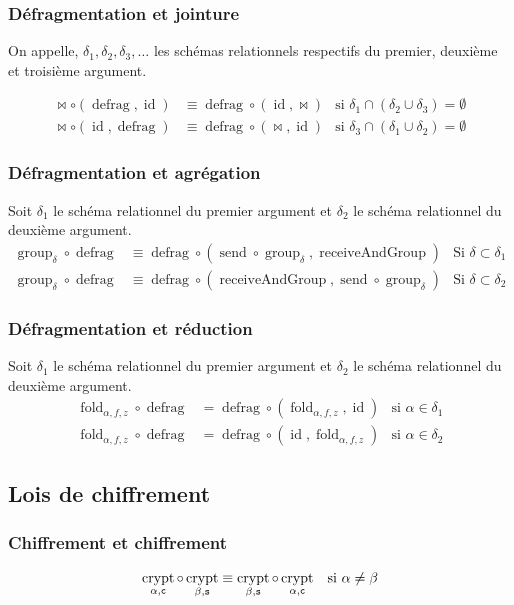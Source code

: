 \documentclass[french]{article}
\DeclareMathOperator{\defrag}{defrag}
\DeclareMathOperator{\crypt}{crypt}
\DeclareMathOperator{\group}{group}
\DeclareMathOperator{\id}{id}
\DeclareMathOperator{\send}{send}
\DeclareMathOperator{\rec}{receiveAndGroup}
\newcommand\typeT[1]{\text{\ttfamily #1}}
\newcommand{\cryptArgs}[2]{\crypt_{#1 , \typeT{#2}}}
\newcommand{\cryptCAlpha}{\cryptArgs{\alpha}{c}}
\newcommand{\groupDelta}{\group_{\delta}}
\newcommand{\fold}[3]{\operatorname{fold}_{#1, #2, #3}}
\newcommand{\foldAlphafz}{\fold{\alpha}{f}{z}}
\newcommand{\args}{Soit $\delta_1$ le schéma relationnel du premier
	argument et $\delta_2$ le schéma relationnel du deuxième
	argument.}
\begin{document}
\subsubsection*{Défragmentation et jointure}
On appelle,
$\delta_1, \delta_2, \delta_3, \dots$ 
les schémas relationnels respectifs
du premier, deuxième et troisième argument.

\begin{align}
\Join \circ (\defrag, \id)
& \equiv
\defrag \circ (\id, \Join)
& \text{si $\delta_1 \cap (\delta_2 \cup \delta_3) = \emptyset$} \\
\Join \circ (\id, \defrag)
& \equiv
\defrag \circ (\Join, \id)
& \text{si $\delta_3 \cap (\delta_1 \cup \delta_2) = \emptyset$} 
\end{align}

\subsubsection*{Défragmentation et agrégation}
\args
\begin{align}
\groupDelta \circ \defrag 
& \equiv \defrag \circ (\send\circ\groupDelta, \rec)
& \text{Si $\delta \subset \delta_1$} \\
\groupDelta \circ \defrag 
& \equiv \defrag \circ (\rec, \send\circ\groupDelta)
& \text{Si $\delta \subset \delta_2$} 
\end{align}

\subsubsection*{Défragmentation et réduction}
\args
\begin{align}
\foldAlphafz \circ \defrag
& = \defrag \circ (\foldAlphafz, \id)
& \text{si $\alpha \in \delta_1$} \\
\foldAlphafz \circ \defrag
& = \defrag \circ (\id, \foldAlphafz)
& \text{si $\alpha \in \delta_2$}
\end{align}

\subsection*{Lois de chiffrement}
\subsubsection*{Chiffrement et chiffrement}
\begin{align}
\cryptCAlpha \circ \cryptArgs{\beta}{s}
& \equiv \cryptArgs{\beta}{s} \circ \cryptCAlpha
& \text{si $\alpha \neq \beta$}
\end{align}
\end{document}
